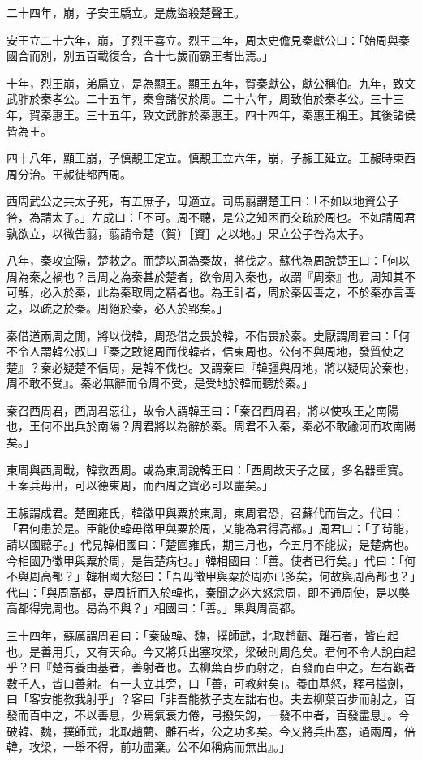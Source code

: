 \begin{pinyinscope}
二十四年，崩，子安王驕立。是歲盜殺楚聲王。

安王立二十六年，崩，子烈王喜立。烈王二年，周太史儋見秦獻公曰：「始周與秦國合而別，別五百載復合，合十七歲而霸王者出焉。」

十年，烈王崩，弟扁立，是為顯王。顯王五年，賀秦獻公，獻公稱伯。九年，致文武胙於秦孝公。二十五年，秦會諸侯於周。二十六年，周致伯於秦孝公。三十三年，賀秦惠王。三十五年，致文武胙於秦惠王。四十四年，秦惠王稱王。其後諸侯皆為王。

四十八年，顯王崩，子慎靚王定立。慎靚王立六年，崩，子赧王延立。王赧時東西周分治。王赧徙都西周。

西周武公之共太子死，有五庶子，毋適立。司馬翦謂楚王曰：「不如以地資公子咎，為請太子。」左成曰：「不可。周不聽，是公之知困而交疏於周也。不如請周君孰欲立，以微告翦，翦請令楚（賀）［資］之以地。」果立公子咎為太子。

八年，秦攻宜陽，楚救之。而楚以周為秦故，將伐之。蘇代為周說楚王曰：「何以周為秦之禍也？言周之為秦甚於楚者，欲令周入秦也，故謂『周秦』也。周知其不可解，必入於秦，此為秦取周之精者也。為王計者，周於秦因善之，不於秦亦言善之，以疏之於秦。周絕於秦，必入於郢矣。」

秦借道兩周之閒，將以伐韓，周恐借之畏於韓，不借畏於秦。史厭謂周君曰：「何不令人謂韓公叔曰『秦之敢絕周而伐韓者，信東周也。公何不與周地，發質使之楚』？秦必疑楚不信周，是韓不伐也。又謂秦曰『韓彊與周地，將以疑周於秦也，周不敢不受』。秦必無辭而令周不受，是受地於韓而聽於秦。」

秦召西周君，西周君惡往，故令人謂韓王曰：「秦召西周君，將以使攻王之南陽也，王何不出兵於南陽？周君將以為辭於秦。周君不入秦，秦必不敢踰河而攻南陽矣。」

東周與西周戰，韓救西周。或為東周說韓王曰：「西周故天子之國，多名器重寶。王案兵毋出，可以德東周，而西周之寶必可以盡矣。」

王赧謂成君。楚圍雍氏，韓徵甲與粟於東周，東周君恐，召蘇代而告之。代曰：「君何患於是。臣能使韓毋徵甲與粟於周，又能為君得高都。」周君曰：「子茍能，請以國聽子。」代見韓相國曰：「楚圍雍氏，期三月也，今五月不能拔，是楚病也。今相國乃徵甲與粟於周，是告楚病也。」韓相國曰：「善。使者已行矣。」代曰：「何不與周高都？」韓相國大怒曰：「吾毋徵甲與粟於周亦已多矣，何故與周高都也？」代曰：「與周高都，是周折而入於韓也，秦聞之必大怒忿周，即不通周使，是以獘高都得完周也。曷為不與？」相國曰：「善。」果與周高都。

三十四年，蘇厲謂周君曰：「秦破韓、魏，撲師武，北取趙藺、離石者，皆白起也。是善用兵，又有天命。今又將兵出塞攻梁，梁破則周危矣。君何不令人說白起乎？曰『楚有養由基者，善射者也。去柳葉百步而射之，百發而百中之。左右觀者數千人，皆曰善射。有一夫立其旁，曰「善，可教射矣」。養由基怒，釋弓搤劍，曰「客安能教我射乎」？客曰「非吾能教子支左詘右也。夫去柳葉百步而射之，百發而百中之，不以善息，少焉氣衰力倦，弓撥矢鉤，一發不中者，百發盡息」。今破韓、魏，撲師武，北取趙藺、離石者，公之功多矣。今又將兵出塞，過兩周，倍韓，攻梁，一舉不得，前功盡棄。公不如稱病而無出』。」


\end{pinyinscope}
